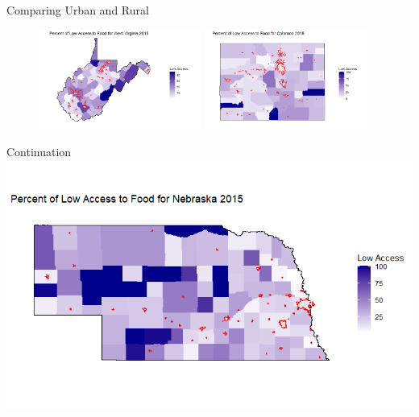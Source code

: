 \documentclass{beamer} %
\begin{document}
 
\begin{frame}{Comparing Urban and Rural}
\begin{figure}
   \includegraphics[width=0.475\textwidth]{WV_Map.jpg}
   \hfill
   \includegraphics[width=0.475\textwidth]{CO_Map.jpg}
\end{figure}
\end{frame}


 
 
\begin{frame}{Continuation}
\includegraphics{NE_Map.jpg}
\end{frame}
 

\printbibliography

 
\end{document}
